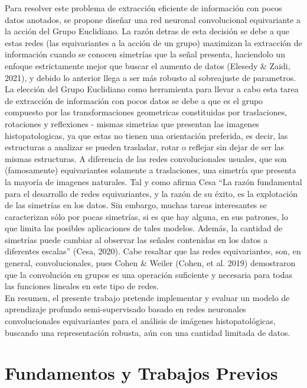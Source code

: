 \documentclass[12pt,letterpaper,final, openany]{scrbook}
\begin{document}
Para resolver este problema de extracción eficiente de información con pocos datos anotados, se propone diseñar una red neuronal convolucional equivariante a la acción del Grupo Euclidiano. La razón detras de esta decisión se debe a que estas redes (las equivariantes a la acción de un grupo) maximizan la extracción de información cuando se conocen simetrías que la señal presenta, haciendolo un enfoque estrictamente mejor que buscar el aumento de datos (Elesedy \& Zaidi, 2021), y debido lo anterior llega a ser más robusto al sobreajuste de parametros. La elección del Grupo Euclidiano como herramienta para llevar a cabo esta tarea de extracción de información con pocos datos se debe a que es el grupo compuesto por las transformaciones geometricas constituidas por traslaciones, rotaciones y reflexiones - mismas simetrias que presentan las imagenes histopatologicas, ya que estas no tienen una orientación preferida, es decir, las estructuras a analizar se pueden trasladar, rotar o reflejar sin dejar de ser las mismas estructuras. A diferencia de las redes convolucionales usuales, que son (famosamente) equivariantes solamente a traslaciones, una simetría que presenta la mayoría de imagenes naturales. Tal y como afirma Cesa ``La razón fundamental para el desarrollo de redes equivariantes, y la razón de su éxito, es la explotación de las simetrías en los datos. Sin embargo, muchas tareas interesantes se caracterizan sólo por pocas simetrías, si es que hay alguna, en sus patrones, lo que limita las posibles aplicaciones de tales modelos. Además, la cantidad de simetrías puede cambiar al observar las señales contenidas en los datos a diferentes escalas” (Cesa, 2020). Cabe resaltar que las redes equivariantes, son, en general, convolucionales, pues Cohen \& Weiler (Cohen, et al. 2019) demostraron que la convolución en grupos es una operación suficiente y necesaria para todas las funciones lineales en este tipo de redes.
\\
En resumen, el presente trabajo pretende implementar y evaluar un modelo de aprendizaje profundo semi-supervisado basado en redes neuronales convolucionales equivariantes para el análisis de imágenes histopatológicas, buscando una representación robusta, aún con una cantidad limitada de datos.
\newpage
\chapter{Fundamentos y Trabajos Previos}
\end{document}
